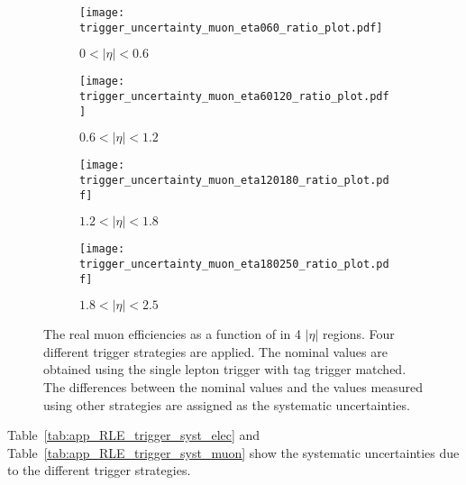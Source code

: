 \begin{figure}[htbp]
    \begin{subfigure}[b]{0.48\textwidth}
        \begin{center}
            \texttt{[image: trigger\_uncertainty\_muon\_eta060\_ratio\_plot.pdf]}
            \caption{$0 < |\eta| < 0.6$}
        \end{center}
    \end{subfigure}
    \begin{subfigure}[b]{0.48\textwidth}
        \begin{center}
            \texttt{[image: trigger\_uncertainty\_muon\_eta60120\_ratio\_plot.pdf]}
            \caption{$0.6 < |\eta| < 1.2$}
        \end{center}
    \end{subfigure}
    \begin{subfigure}[b]{0.48\textwidth}
        \begin{center}
            \texttt{[image: trigger\_uncertainty\_muon\_eta120180\_ratio\_plot.pdf]}
            \caption{$1.2 < |\eta| < 1.8$}
        \end{center}
    \end{subfigure}
    \begin{subfigure}[b]{0.48\textwidth}
        \begin{center}
            \texttt{[image: trigger\_uncertainty\_muon\_eta180250\_ratio\_plot.pdf]}
            \caption{$1.8 < |\eta| < 2.5$}
        \end{center}
    \end{subfigure}
    \caption{The real muon efficiencies as a function of \pt in 4 $|\eta|$ regions.
    Four different trigger strategies are applied.
    The nominal values are obtained using the single lepton trigger with tag trigger matched.
    The differences between the nominal values and the values measured using other strategies are assigned as the systematic uncertainties.}
    \label{fig:app_RLE_trigger_bias_muon}
\end{figure}

Table~\ref{tab:app_RLE_trigger_syst_elec} and Table~\ref{tab:app_RLE_trigger_syst_muon} show the systematic uncertainties due to the different trigger strategies.

